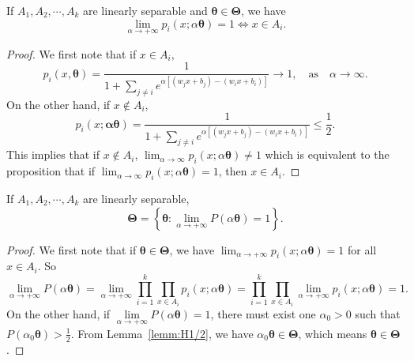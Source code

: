 \begin{lemma}
	If $A_1,A_2,\cdots,A_k$ are linearly separable and $\bm\theta \in \bm\Theta$, we have
	\begin{equation}
	\lim_{\alpha\rightarrow +\infty}p_i(x; \alpha\bm\theta) = 1\Leftrightarrow x\in A_i. 
	\end{equation}
\end{lemma}
\begin{proof}
	We first note that if  $x\in A_i$,
	\begin{equation}
	 p_i(x,\bm \theta) = \frac{1}{1+\sum\limits_{j\neq i}e^{\alpha[(w_j x+ b_j)-(w_i x+b_i)]}} \to 1, \quad \text{as} \quad \alpha \to \infty.
	\end{equation}
	On the other hand, if $x\not\in A_i$, 
	\begin{equation}
	p_i(x; \bm\alpha\bm\theta) = \frac{1}{1+\sum\limits_{j\neq i}e^{\alpha[(w_j x+ b_j)-(w_i x+b_i)]}} \leq \frac{1}{2}.
	\end{equation}
	This implies that if $x\not\in A_i$, $\lim_{\alpha\rightarrow \infty}p_i(x; \alpha\bm \theta)\neq 1$ which is equivalent to the proposition that if $\lim_{\alpha\rightarrow \infty}p_i(x; \alpha\bm \theta)= 1$, then $x\in A_i$.
\end{proof}

\begin{lemma}{\label{thm2}} If $A_1,A_2,\cdots,A_k$ are linearly separable, 
	\begin{equation}
	\bm\Theta = \left\{\bm\theta: \lim_{\alpha\rightarrow +\infty}P(\alpha\bm\theta) = 1\right\}.
	\end{equation}
\end{lemma}

\begin{proof}
 	We first note that if $\bm\theta \in\bm\Theta$, we have $\displaystyle\lim_{\alpha\rightarrow +\infty}p_i(x; \alpha\bm\theta) = 1$ for all $x\in A_i$. So
	\begin{equation}
	\lim\limits_{\alpha\rightarrow +\infty} P(\alpha\bm\theta) = \lim\limits_{\alpha\rightarrow +\infty} \prod\limits_{i = 1}^k \prod\limits_{x\in A_i} p_i(x; \alpha\bm\theta) = \prod\limits_{i = 1}^k \prod\limits_{x\in A_i} \lim\limits_{\alpha\rightarrow +\infty}p_i(x; \alpha\bm\theta) = 1.
	\end{equation}
	On the other hand, if $\lim\limits_{\alpha\rightarrow +\infty} P(\alpha\bm\theta) = 1$, there must exist one $\alpha_0>0$ such that $P(\alpha_0\bm\theta) >\frac{1}{2}$. From Lemma~\ref{lemm:H1/2}, we have $\alpha_0\bm\theta\in\bm\Theta$, which means $\bm\theta\in\bm\Theta$.
\end{proof}


